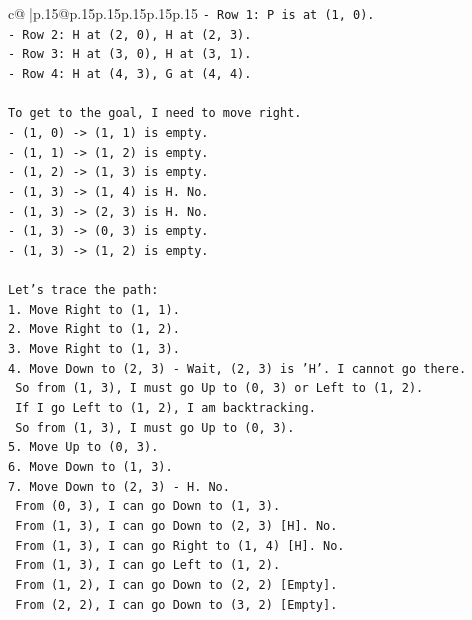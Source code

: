 \documentclass{article}
\begin{document}
{\begin{supertabular}{c@{$\;$}|p{.15\linewidth}@{}p{.15\linewidth}p{.15\linewidth}p{.15\linewidth}p{.15\linewidth}p{.15\linewidth}}
{{{\texttt{{-} Row 1: P is at (1, 0).} \\
\texttt{{-} Row 2: H at (2, 0), H at (2, 3).} \\
\texttt{{-} Row 3: H at (3, 0), H at (3, 1).} \\
\texttt{{-} Row 4: H at (4, 3), G at (4, 4).} \\
\\ 
\texttt{To get to the goal, I need to move right.} \\
\texttt{{-} (1, 0) {-}> (1, 1) is empty.} \\
\texttt{{-} (1, 1) {-}> (1, 2) is empty.} \\
\texttt{{-} (1, 2) {-}> (1, 3) is empty.} \\
\texttt{{-} (1, 3) {-}> (1, 4) is H. No.} \\
\texttt{{-} (1, 3) {-}> (2, 3) is H. No.} \\
\texttt{{-} (1, 3) {-}> (0, 3) is empty.} \\
\texttt{{-} (1, 3) {-}> (1, 2) is empty.} \\
\\ 
\texttt{Let's trace the path:} \\
\texttt{1. Move Right to (1, 1).} \\
\texttt{2. Move Right to (1, 2).} \\
\texttt{3. Move Right to (1, 3).} \\
\texttt{4. Move Down to (2, 3) {-} Wait, (2, 3) is 'H'. I cannot go there.} \\
\texttt{   So from (1, 3), I must go Up to (0, 3) or Left to (1, 2).} \\
\texttt{   If I go Left to (1, 2), I am backtracking.} \\
\texttt{   So from (1, 3), I must go Up to (0, 3).} \\
\texttt{5. Move Up to (0, 3).} \\
\texttt{6. Move Down to (1, 3).} \\
\texttt{7. Move Down to (2, 3) {-} H. No.} \\
\texttt{   From (0, 3), I can go Down to (1, 3).} \\
\texttt{   From (1, 3), I can go Down to (2, 3) {[}H{]}. No.} \\
\texttt{   From (1, 3), I can go Right to (1, 4) {[}H{]}. No.} \\
\texttt{   From (1, 3), I can go Left to (1, 2).} \\
\texttt{   From (1, 2), I can go Down to (2, 2) {[}Empty{]}.} \\
\texttt{   From (2, 2), I can go Down to (3, 2) {[}Empty{]}.} \\
}}}
\end{supertabular}}
\end{document}
